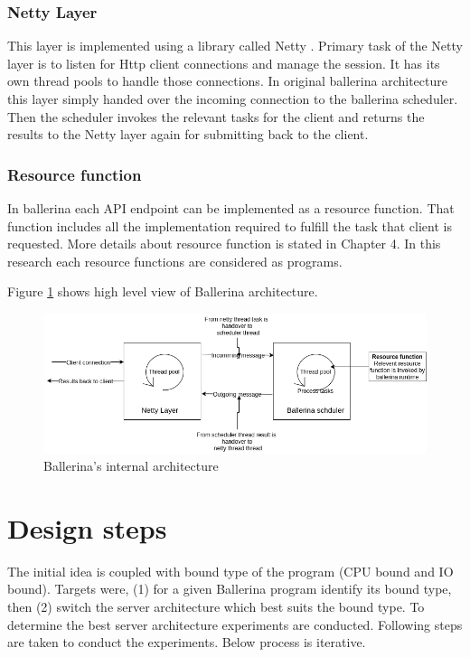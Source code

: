 \subsubsection{Netty Layer}

This layer is implemented using a library called Netty \cite{netty}. Primary task of the Netty layer is to listen for Http client connections and manage the session. It has its own thread pools to handle those connections. In original ballerina architecture this layer simply handed over the incoming connection to the ballerina scheduler. Then the scheduler invokes the relevant tasks for the client and returns the results to the Netty layer again for submitting back to the client.

\subsubsection{Resource function}

In ballerina each API endpoint can be implemented as a resource function. That function includes all the implementation required to fulfill the task that client is requested. More details about resource function is stated in Chapter 4. In this research each resource functions are considered as programs.


Figure \ref{bal_internal} shows high level view of Ballerina architecture.


\begin{figure}[htbp]
	\begin{center}
		\includegraphics[scale=0.5]{figures/bal-internal.png}
	\end{center}
	\caption{Ballerina's internal architecture}
	\label{bal_internal}
\end{figure}

\section{Design steps}

The initial idea is coupled with bound type of the program (CPU bound and IO bound). Targets were, (1) for a given Ballerina program identify its bound type, then (2) switch the server architecture which best suits the bound type. To determine the best  server architecture experiments are conducted. Following steps are taken to conduct the experiments. Below process is iterative.

